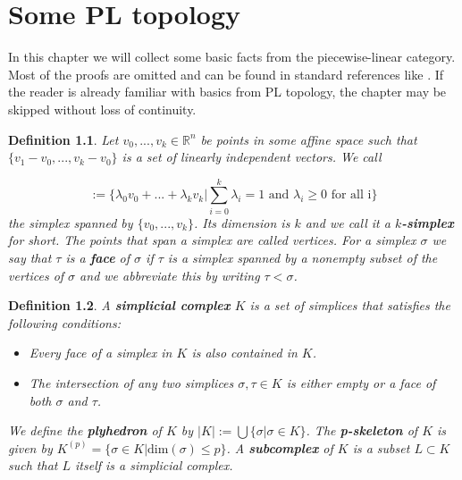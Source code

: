 \documentclass[11pt]{book}
\newtheorem{definition}{Definition}
\begin{document}
\tableofcontents

\chapter{Some PL topology}
\label{sec:Einleitung}

In this chapter we will collect some basic facts from the piecewise-linear category. Most of the proofs are omitted and can be found in standard references like \cite{pltopo}. If the reader is already familiar with basics from PL topology, the chapter may be skipped without loss of continuity.

\begin{definition}
Let $v_0,...,v_k \in \mathbb{R}^n$ be points in some affine space such that $\{ v_1-v_0,...,v_k-v_0 \}$ is a set of linearly independent vectors. We call

\begin{equation}
[v_0,...,v_k] := \Biggl \{  \lambda_0v_0+...+ \lambda_kv_k \Bigg |  \sum_{i=0}^k \lambda_i =1 \text{ and } \lambda_i \geq 0 \text{ for all i} \Biggr \}
\end{equation}
the simplex spanned by $\{v_0,...,v_k \}$. Its dimension is $k$ and we call it a \textbf{$k$-simplex} for short. The points that span a simplex are called vertices. For a simplex $\sigma$ we say that $\tau$ is a \textbf{face} of $\sigma$ if $\tau$ is a simplex spanned by a nonempty subset of the vertices of $\sigma$ and we abbreviate this by writing $\tau < \sigma$.
\end{definition}

\begin{definition}
A \textbf{simplicial complex} $K$ is a set of simplices that satisfies the following conditions:

\begin{itemize}
\item Every face of a simplex in $K$ is also contained in $K$.
\item The intersection of any two simplices $\sigma, \tau \in K$ is either empty or a face of both $\sigma$ and $\tau$.
\end{itemize}

We define the \textbf{plyhedron} of $K$ by $|K|:= \bigcup \{ \sigma | \sigma \in K \}$. The \textbf{p-skeleton} of $K$ is given by $K^{(p)}= \{ \sigma \in  K | \text{dim}(\sigma) \leq p \}$. A \textbf{subcomplex} of $K$ is a subset $L \subset K$ such that $L$ itself is a simplicial complex.
\end{definition}
\end{document}
